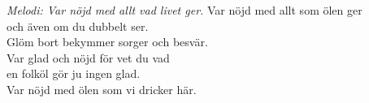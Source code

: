 {\footnotesize\textit{Melodi: Var nöjd med allt vad livet ger.}}
\vspace{10pt}
Var nöjd med allt som ölen ger\\
och även om du dubbelt ser.\\
Glöm bort bekymmer sorger och besvär.\\
Var glad och nöjd för vet du vad\\
en folköl gör ju ingen glad.\\
Var nöjd med ölen som vi dricker här.
